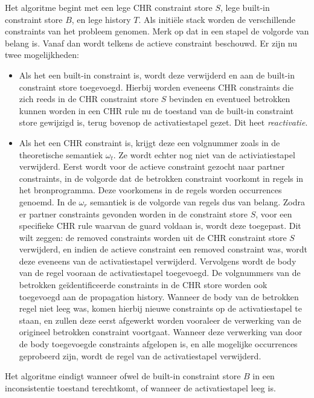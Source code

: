Het algoritme begint met een lege CHR constraint store $S$, lege built-in constraint store $B$, en lege history $T$. Als initi\"ele stack worden de verschillende constraints van het probleem genomen. Merk op dat in een stapel de volgorde van belang is. Vanaf dan wordt telkens de actieve constraint beschouwd. Er zijn nu twee mogelijkheden: \begin{itemize}
\item Als het een built-in constraint is, wordt deze verwijderd en aan de built-in constraint store toegevoegd. Hierbij worden eveneens CHR constraints die zich reeds in de CHR constraint store $S$ bevinden en eventueel betrokken kunnen worden in een CHR rule nu de toestand van de built-in constraint store gewijzigd is, terug bovenop de activatiestapel gezet. Dit heet {\em reactivatie}.
\item Als het een CHR constraint is, krijgt deze een volgnummer zoals in de theoretische semantiek $\omega_t$. Ze wordt echter nog niet van de activiatiestapel verwijderd. Eerst wordt voor de actieve constraint gezocht naar partner constraints, in de volgorde dat de betrokken constraint voorkomt in regels in het bronprogramma. Deze voorkomens in de regels worden occurrences genoemd. In de $\omega_r$ semantiek is de volgorde van regels dus van belang. Zodra er partner constraints gevonden worden in de constraint store $S$, voor een specifieke CHR rule waarvan de guard voldaan is, wordt deze toegepast. Dit wilt zeggen: de removed constraints worden uit de CHR constraint store $S$ verwijderd, en indien de actieve constraint een removed constraint was, wordt deze eveneens van de activatiestapel verwijderd. Vervolgens wordt de body van de regel vooraan de activatiestapel toegevoegd. De volgnummers van de betrokken ge\"identificeerde constraints in de CHR store worden ook toegevoegd aan de propagation history. Wanneer de body van de betrokken regel niet leeg was, komen hierbij nieuwe constraints op de activatiestapel te staan, en zullen deze eerst afgewerkt worden vooraleer de verwerking van de origineel betrokken constraint voortgaat. Wanneer deze verwerking van door de body toegevoegde constraints afgelopen is, en alle mogelijke occurrences geprobeerd zijn, wordt de regel van de activatiestapel verwijderd.
\end{itemize}
Het algoritme eindigt wanneer ofwel de built-in constraint store $B$ in een inconsistentie toestand terechtkomt, of wanneer de activatiestapel leeg is.
